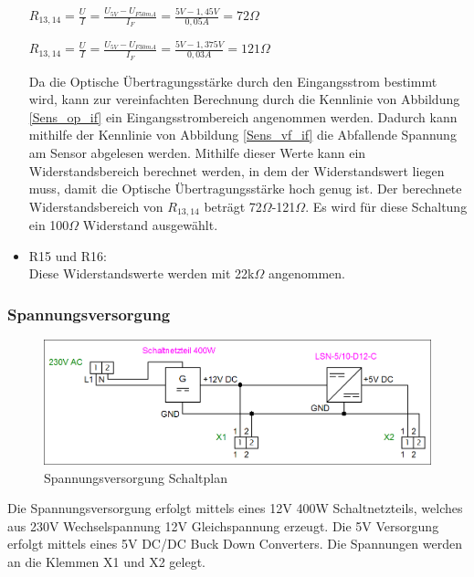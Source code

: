 \begin{itemize}
\begin{center}
$R_{13,14}=\frac{U}{I}=\frac{U_{5V}-U_{F 50mA}}{I_{F}}=\frac{5V-1,45V}{0,05A}=72\Omega$
\end{center}
\begin{center}
$R_{13,14}=\frac{U}{I}=\frac{U_{5V}-U_{F 30mA}}{I_{F}}=\frac{5V-1,375V}{0,03A}=121\Omega$
\end{center}
Da die Optische Übertragungsstärke durch den Eingangsstrom bestimmt wird, kann zur vereinfachten Berechnung durch die Kennlinie von Abbildung \ref{Sens_op_if} ein Eingangsstrombereich angenommen werden. Dadurch kann mithilfe der Kennlinie von Abbildung \ref{Sens_vf_if} die Abfallende Spannung am Sensor abgelesen werden. Mithilfe dieser Werte kann ein Widerstandsbereich berechnet werden, in dem der Widerstandswert liegen muss, damit die Optische Übertragungsstärke  hoch genug ist. Der berechnete Widerstandsbereich von $R_{13,14}$ beträgt 72$\Omega$-121$\Omega$. Es wird für diese Schaltung ein 100$\Omega$ Widerstand ausgewählt.
\item R15 und R16:\\
Diese Widerstandswerte werden mit 22k$\Omega$ angenommen.
\end{itemize}
\subsubsection{Spannungsversorgung}
\begin{figure}[H] 
\begin{center}

\includegraphics[width=15cm]{Bilder/Schaltplan/Spannungsversorgungen}
\caption{Spannungsversorgung Schaltplan}
\label{Spannungsversorgung}

\end{center}
\end{figure}
Die Spannungsversorgung erfolgt mittels eines 12V 400W Schaltnetzteils, welches aus 230V Wechselspannung 12V Gleichspannung erzeugt. Die 5V Versorgung erfolgt mittels eines 5V DC/DC Buck Down Converters.
Die Spannungen werden an die Klemmen X1 und X2 gelegt.

